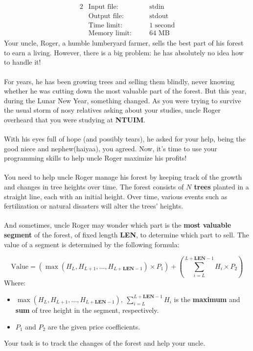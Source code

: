 \documentclass[12pt,a4paper]{article}
\begin{document}
\begin{alignat*} {2}
 &   \text{Input file:}   \quad     &&\text{stdin}\\
 &   \text{Output file:}  \quad     &&\text{stdout}\\
 &   \text{Time limit:}   \quad     &&\text{1 second}\\
 &   \text{Memory limit:} \quad     &&\text{64 MB}
\end{alignat*}
\noindent
Your uncle, Roger, a humble lumberyard farmer, sells the best part of his forest to earn a living. However, there is a big problem: he has absolutely no idea how to handle it! 
\\\\
\noindent
For years, he has been growing trees and selling them blindly, never knowing whether he was cutting down the most valuable part of the forest. But this year, during the Lunar New Year, something changed. As you were trying to survive the usual storm of nosy relatives asking about your studies, uncle Roger overheard that you were studying at \textbf{NTUIM}.  
\\\\
\noindent
With his eyes full of hope (and possibly tears), he asked for your help, being the good niece and nephew(haiyaa), you agreed. Now, it's time to use your programming skills to help uncle Roger maximize his profits!
\\\\
\noindent
You need to help uncle Roger manage his forest by keeping track of the growth and changes in tree heights over time. The forest consists of \textbf{\(N\) trees} planted in a straight line, each with an initial height. Over time, various events such as fertilization or natural disasters will alter the trees' heights.
\\\\
\noindent
And sometimes, uncle Roger may wonder which part is the \textbf{most valuable segment} of the forest, of fixed length \textbf{LEN}, to determine which part to sell. The value of a segment is determined by the following formula:

\[
\text{Value} = (\max(H_L, H_{L+1}, \dots, H_{L+\textbf{LEN}-1}) \times P_1) + (\sum_{i=L}^{L+\textbf{LEN}-1} H_i \times P_2)
\]
\noindent
Where:
\begin{itemize}
    \item \( \max(H_L, H_{L+1}, \dots, H_{L+\textbf{LEN}-1}),\ \sum_{i=L}^{L+\textbf{LEN}-1} H_i \) is the \textbf{maximum} and \textbf{sum} of tree height in the segment, respectively.
    \item \( P_1 \) and \( P_2 \) are the given price coefficients.
\end{itemize}
\noindent
Your task is to track the changes of the forest and help your uncle.
\end{document}
